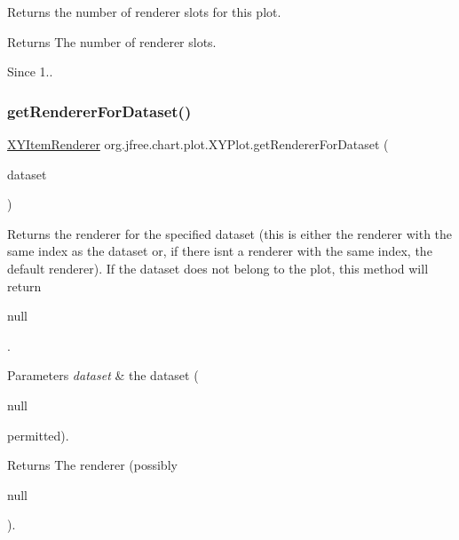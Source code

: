 Returns the number of renderer slots for this plot.

\begin{DoxyReturn}{Returns}
The number of renderer slots.
\end{DoxyReturn}
\begin{DoxySince}{Since}
1.. 
\end{DoxySince}
\mbox{\label{classorg_1_1jfree_1_1chart_1_1plot_1_1_x_y_plot_a682acf112cb3afe0f6b8107f7e3aa182}} 
\subsubsection{\texorpdfstring{get\+Renderer\+For\+Dataset()}{getRendererForDataset()}}
{\footnotesize\ttfamily \mbox{\hyperlink{interfaceorg_1_1jfree_1_1chart_1_1renderer_1_1xy_1_1_x_y_item_renderer}{X\+Y\+Item\+Renderer}} org.\+jfree.\+chart.\+plot.\+X\+Y\+Plot.\+get\+Renderer\+For\+Dataset (\begin{DoxyParamCaption}\item[{\mbox{\hyperlink{interfaceorg_1_1jfree_1_1data_1_1xy_1_1_x_y_dataset}{X\+Y\+Dataset}}}]{dataset }\end{DoxyParamCaption})}

Returns the renderer for the specified dataset (this is either the renderer with the same index as the dataset or, if there isn\textquotesingle{}t a renderer with the same index, the default renderer). If the dataset does not belong to the plot, this method will return
\begin{DoxyCode}
null 
\end{DoxyCode}
 .


\begin{DoxyParams}{Parameters}
{\em dataset} & the dataset (
\begin{DoxyCode}
null 
\end{DoxyCode}
 permitted).\\
\hline
\end{DoxyParams}
\begin{DoxyReturn}{Returns}
The renderer (possibly
\begin{DoxyCode}
null 
\end{DoxyCode}
 ). 
\end{DoxyReturn}
\mbox{\label{classorg_1_1jfree_1_1chart_1_1plot_1_1_x_y_plot_aa585297f9247a4db3f9eada8935148be}} 
